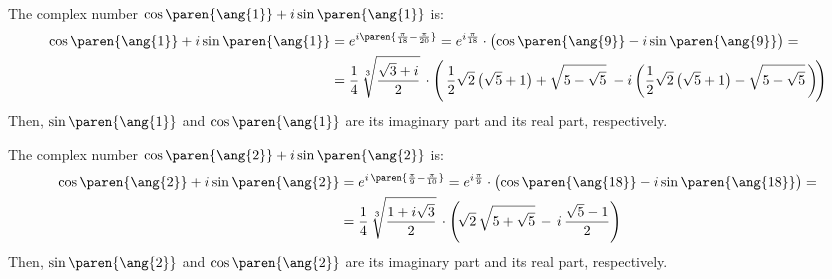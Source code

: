 The complex number $\cos\paren{\ang{1}} + i \sin\paren{\ang{1}}$ is:
\begin{align*}
 \cos\paren{\ang{1}} + i \sin\paren{\ang{1}}
 &= e^{i \paren{\frac{\pi}{18} - \frac{\pi}{20}}}
  = e^{i \frac{\pi}{18}} \cdot
    \big( \! \cos\paren{\ang{9}} - i \sin\paren{\ang{9}} \big) = \\
 &= \frac{1}{4} \, \sqrt[3]{\frac{\sqrt{3} + i}{2}}
    \, \cdot
    \Bigg( \,
      \frac{1}{2} \sqrt{2} \, \big(\sqrt{5} + 1 \big)
      + \sqrt{5 - \sqrt{5}}
      \; - i \, \bigg(
      \frac{1}{2} \sqrt{2} \, \big(\sqrt{5} + 1 \big)
      - \sqrt{5 - \sqrt{5}} \,
      \bigg) \!
   \Bigg)
\end{align*}
Then, $\sin\paren{\ang{1}}$ and $\cos\paren{\ang{1}}$
are its imaginary part and its real part, respectively.

The complex number $\cos\paren{\ang{2}} + i \sin\paren{\ang{2}}$ is:
\begin{align*}
 \cos\paren{\ang{2}} + i \sin\paren{\ang{2}}
 &= e^{i \, \paren{\frac{\pi}{9} - \frac{\pi}{10}}}
  = e^{i \frac{\pi}{9}} \cdot
    \big( \! \cos\paren{\ang{18}} - i \sin\paren{\ang{18}} \big) = \\
 &= \frac{1}{4} \, \sqrt[3]{\frac{1 + i \sqrt{3}}{2}}
    \, \cdot
    \Bigg( \!
      \sqrt{2} \, \sqrt{5 + \sqrt{5}}
      \, - \, i \, \frac{\sqrt{5} - 1}{2}
   \Bigg)
\end{align*}
Then, $\sin\paren{\ang{2}}$ and $\cos\paren{\ang{2}}$
are its imaginary part and its real part, respectively.
